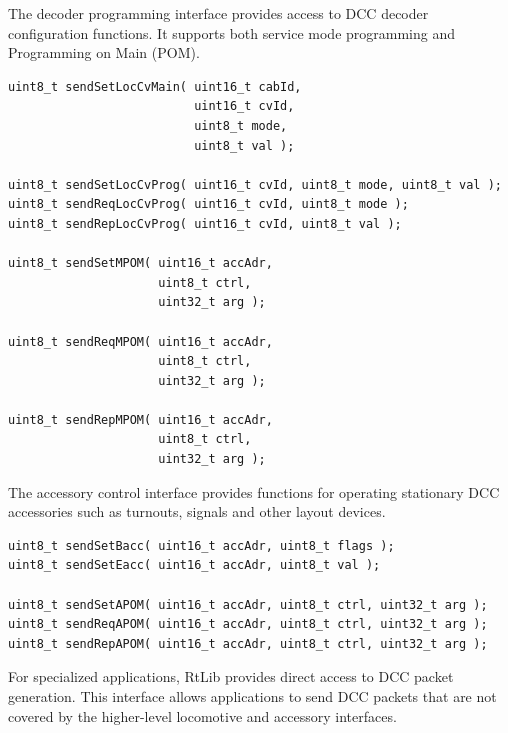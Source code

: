 
The decoder programming interface provides access to DCC decoder configuration 
functions. It supports both service mode programming and Programming on Main (POM).

\begin{lstlisting}[style=api-interface]
uint8_t sendSetLocCvMain( uint16_t cabId,
                          uint16_t cvId,
                          uint8_t mode,
                          uint8_t val );

uint8_t sendSetLocCvProg( uint16_t cvId, uint8_t mode, uint8_t val );
uint8_t sendReqLocCvProg( uint16_t cvId, uint8_t mode );
uint8_t sendRepLocCvProg( uint16_t cvId, uint8_t val );

uint8_t sendSetMPOM( uint16_t accAdr,
                     uint8_t ctrl,
                     uint32_t arg );

uint8_t sendReqMPOM( uint16_t accAdr,
                     uint8_t ctrl,
                     uint32_t arg );

uint8_t sendRepMPOM( uint16_t accAdr,
                     uint8_t ctrl,
                     uint32_t arg );
\end{lstlisting}


The accessory control interface provides functions for operating stationary DCC 
accessories such as turnouts, signals and other layout devices.

\begin{lstlisting}[style=api-interface]
uint8_t sendSetBacc( uint16_t accAdr, uint8_t flags );
uint8_t sendSetEacc( uint16_t accAdr, uint8_t val );

uint8_t sendSetAPOM( uint16_t accAdr, uint8_t ctrl, uint32_t arg );
uint8_t sendReqAPOM( uint16_t accAdr, uint8_t ctrl, uint32_t arg );
uint8_t sendRepAPOM( uint16_t accAdr, uint8_t ctrl, uint32_t arg );
\end{lstlisting}


For specialized applications, RtLib provides direct access to DCC packet generation. 
This interface allows applications to send DCC packets that are not covered by the
 higher-level locomotive and accessory interfaces.

